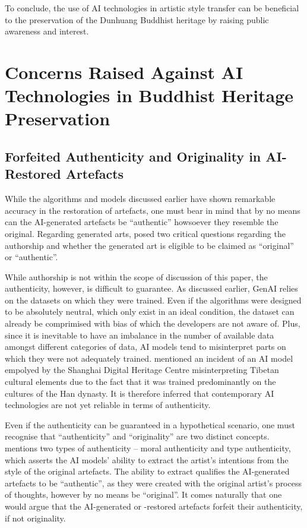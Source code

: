 To conclude, the use of AI technologies in artistic style transfer can be beneficial to the preservation of
the Dunhuang Buddhist heritage by raising public awareness and interest.

\section{Concerns Raised Against AI Technologies in Buddhist Heritage Preservation}

\subsection{Forfeited Authenticity and Originality in AI-Restored Artefacts}

While the algorithms and models discussed earlier have shown remarkable accuracy in the restoration of
artefacts, one must bear in mind that by no means can the AI-generated artefacts be ``authentic'' howsoever
they resemble the original. Regarding generated arts,  posed two 
critical questions regarding the authorship and whether the generated art is eligible to be claimed as
``original'' or ``authentic''.

While authorship is not within the scope of discussion of this paper, the authenticity, however, is difficult to guarantee.
As discussed earlier, GenAI relies on the datasets on which they were trained. Even if the algorithms were designed
to be absolutely neutral, which only exist in an ideal condition, the dataset can already be comprimised with bias
of which the developers are not aware of. Plus, since it is inevitable to have an imbalance in the number of
available data amongst different categories of data, AI models tend to misinterpret parts on which they were not
adequately trained.  mentioned an incident of an AI model
empolyed by the Shanghai Digital Heritage Centre misinterpreting Tibetan cultural elements due to the fact that
it was trained predominantly on the cultures of the Han dynasty. It is therefore inferred that contemporary AI
technologies are not yet reliable in terms of authenticity.

Even if the authenticity can be guaranteed in a hypothetical scenario, one must recognise that ``authenticity''
and ``originality'' are two distinct concepts.  mentions two types
of authenticity -- moral authenticity and type authenticity, which asserts the AI models' ability to extract the
artist's intentions from the style of the original artefacts. The ability to extract qualifies the AI-generated
artefacts to be ``authentic'', as they were created with the original artist's process of thoughts, however by no
means be ``original''. It comes naturally that one would argue that the AI-generated or -restored artefacts forfeit
their authenticity, if not originality.


